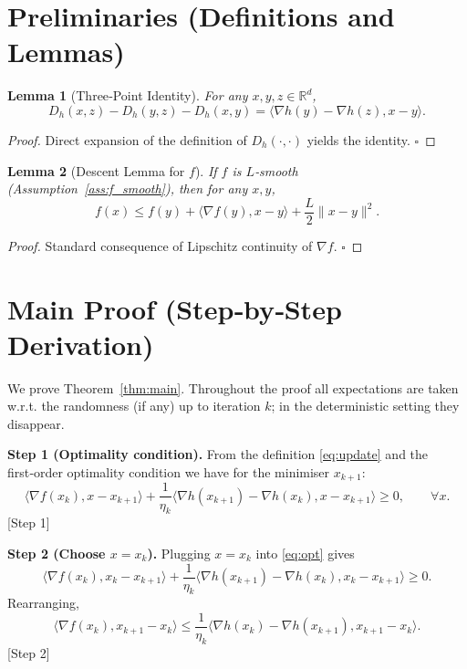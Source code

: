 \documentclass{article}
\newtheorem{lemma}{Lemma}
\newcommand{\grad}{\nabla}
\newcommand{\Breg}{D_{h}}
\newcommand{\inner}[2]{\langle #1,#2\rangle}
\begin{document}
\newpage
\section*{Preliminaries (Definitions and Lemmas)}
\begin{lemma}[Three‑Point Identity]\label{lem:3pt}
For any $x,y,z\in\mathbb{R}^{d}$,
\[
\Breg(x,z)-\Breg(y,z)-\Breg(x,y)=\inner{\grad h(y)-\grad h(z)}{x-y}.
\]
\end{lemma}
\begin{proof}
Direct expansion of the definition of $\Breg(\cdot,\cdot)$ yields the identity. \hfill $\square$
\end{proof}

\begin{lemma}[Descent Lemma for $f$]\label{lem:descent}
If $f$ is $L$‑smooth (Assumption~\ref{ass:f_smooth}), then for any $x,y$,
\[
f(x)\le f(y)+\inner{\grad f(y)}{x-y}+\frac{L}{2}\|x-y\|^{2}.
\]
\end{lemma}
\begin{proof}
Standard consequence of Lipschitz continuity of $\grad f$. \hfill $\square$
\end{proof}

\section*{Main Proof (Step‑by‑Step Derivation)}
We prove Theorem~\ref{thm:main}. Throughout the proof all expectations are taken w.r.t. the randomness (if any) up to iteration $k$; in the deterministic setting they disappear.

\noindent\textbf{Step 1 (Optimality condition).}  
From the definition \eqref{eq:update} and the first‑order optimality condition we have for the minimiser $x_{k+1}$:
\begin{equation}\label{eq:opt}
\inner{\grad f(x_{k})}{x-x_{k+1}}+\frac{1}{\eta_{k}}\inner{\grad h(x_{k+1})-\grad h(x_{k})}{x-x_{k+1}}\ge0,\qquad\forall x.
\end{equation}
\hfill[Step 1]

\noindent\textbf{Step 2 (Choose $x=x_{k}$).}  
Plugging $x=x_{k}$ into \eqref{eq:opt} gives
\[
\inner{\grad f(x_{k})}{x_{k}-x_{k+1}}+\frac{1}{\eta_{k}}\inner{\grad h(x_{k+1})-\grad h(x_{k})}{x_{k}-x_{k+1}}\ge0.
\]
Rearranging,
\begin{equation}\label{eq:inner}
\inner{\grad f(x_{k})}{x_{k+1}-x_{k}}\le\frac{1}{\eta_{k}}\inner{\grad h(x_{k})-\grad h(x_{k+1})}{x_{k+1}-x_{k}}.
\end{equation}
\hfill[Step 2]
\end{document}
